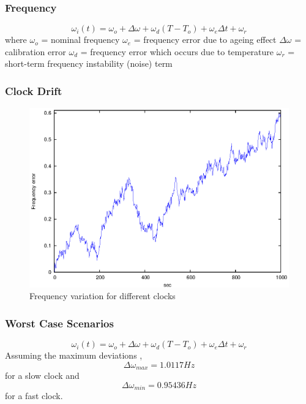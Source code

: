 \documentclass[t]{beamer}
\begin{document}
\begin{frame}
    \frametitle{Frequency}
   \begin{equation}
\omega_i(t) = \omega_o + \Delta \omega + \omega_d(T-T_o) +
\omega_e\Delta t + \omega_r \label{frequency}
\end{equation}
\newline
where\newline \newline
      $\omega_o$ = nominal frequency \newline
      $\omega_e$ = frequency error due to ageing effect \newline
      $\Delta \omega$ = calibration error \newline
      $\omega_d$ = frequency error which occurs due to temperature \newline
      $\omega_r$ = short-term frequency instability (noise) term \newline
\end{frame}
\begin{frame}
\frametitle{Clock Drift}
\begin{figure}
\includegraphics[width= 0.6 \textwidth]{freq_var}
\caption{Frequency variation for different clocks}
\end{figure}
\end{frame}
\begin{frame}
\frametitle{Worst Case Scenarios}
 \begin{equation}
\omega_i(t) = \omega_o + \Delta \omega + \omega_d(T-T_o) +
\omega_e\Delta t + \omega_r \label{frequency}
\end{equation}
Assuming the maximum deviations ,
\begin{equation}
\Delta \omega_{max} = 1.0117 Hz
\end{equation}
for a slow clock and
\begin{equation}
 \Delta \omega_{min} = 0.95436 Hz
\end{equation}
for a fast clock.
\end{frame}
\end{document}
